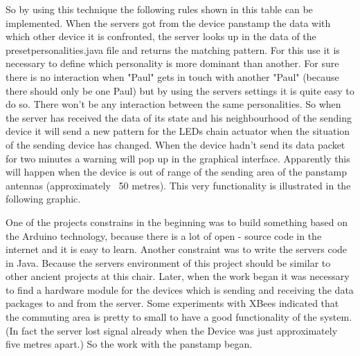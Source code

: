 So by using this technique the following rules shown in this table can be implemented.
When the servers got from the device panstamp the data with which other device it is confronted, the server looks up in the data of the presetpersonalities.java file and returns the matching pattern. For this use it is necessary to define which personality is more dominant than another.
\newline
\newline
For sure there is no interaction when "Paul" gets in touch with another "Paul" (because there should only be one Paul) but by using the servers settings it is quite easy to do so. There won't be any interaction between the same personalities.
\newline
\newline
So when the server has received the data of its state and his neighbourhood of the sending device it will send a new pattern for the LEDs chain actuator when the situation of the sending device has changed.
When the device hadn't send its data packet for two minutes a warning will pop up in the graphical interface. Apparently this will happen when the device is out of range of the sending area of the panstamp antennas (approximately ~50 metres).
This very functionality is illustrated in the following graphic.
 
One of the projects constrains in the beginning was to build something based on the Arduino technology, because there is a lot of open - source code in the internet and it is easy to learn.
Another constraint was to write the servers code in Java. Because the servers environment of this project should be similar to other ancient projects at this chair.
Later, when the work began it was necessary to find a hardware module for the devices which is sending and receiving the data packages to and from the server. Some experiments with XBees indicated that the commuting area is pretty to small to have a good functionality of the system. (In fact the server lost signal already when the Device was just approximately five metres apart.) So the work with the panstamp began.   
 

